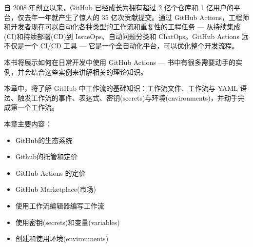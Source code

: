 自 2008 年创立以来，GitHub 已经成长为拥有超过 2 亿个仓库和 1 亿用户的平台，仅去年一年就产生了惊人的 35 亿次贡献提交。通过 GitHub Actions，工程师和开发者现在可以自动化各种类型的工作流和重复性的工程任务 --- 从持续集成(CI)和持续部署(CD)到 IssueOps、自动问题分类和 ChatOps。GitHub Actions 远不仅是一个 CI/CD 工具 --- 它是一个全自动化平台，可以优化整个开发流程。

本书将展示如何在日常开发中使用 GitHub Actions --- 书中有很多需要动手的实例，并会结合这些实例来讲解相关的理论知识。

本章中，将了解 GitHub 中工作流的基础知识：工作流文件、工作流与 YAML 语法、触发工作流的事件、表达式、密钥(secrets)与环境(environments)，并动手完成第一个工作流。

本章主要内容：

\begin{itemize}
\item 
GitHub的生态系统

\item 
Github的托管和定价

\item 
GitHub Actions 的定价

\item 
GitHub Marketplace(市场)

\item 
使用工作流编辑器编写工作流

\item 
使用密钥(secrets)和变量(variables)

\item 
创建和使用环境(environments)
\end{itemize}